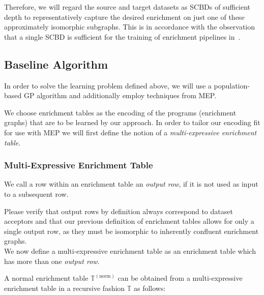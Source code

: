 Therefore, we will regard the source and target datasets as \acfp{SCBD} of sufficient depth to representatively capture the desired enrichment on just one of these approximately isomorphic subgraphs.
This is in accordance with the observation that a single \ac{SCBD} is sufficient for the training of enrichment pipelines in~\cite{sherif:2015a}.\\

\subsection{Baseline Algorithm}
\label{ssec:baseline}

In order to solve the learning problem defined above, we will use a population-based \acf{GP} algorithm and additionally employ techniques from \acf{MEP}.

We choose enrichment tables as the encoding of the programs (\ie enrichment graphs) that are to be learned by our approach.
In order to tailor our encoding fit for use with \ac{MEP} we will first define the notion of a \emph{multi-expressive enrichment table}.

\subsubsection{Multi-Expressive Enrichment Table}
\label{sssec:meet}
We call a row within an enrichment table an \emph{output row}, if it is not used as input to a subsequent row.

Please verify that output rows by definition always correspond to dataset acceptors and that our previous definition of enrichment tables allows for only a single output row, as they must be isomorphic to inherently confluent enrichment graphs.\\

We now define a multi-expressive enrichment table as an enrichment table which has more than one \emph{output row}.

A normal enrichment table $\mathbb{T}^{(\text{norm})}$ can be obtained from a multi-expressive enrichment table in a recursive fashion $\mathbb{T}$ as follows:

